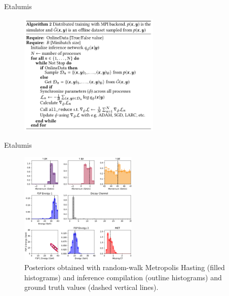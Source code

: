 \documentclass[AERbeamer%
              ,optEnglish%
              ,optBiber%
              ,optBibstyleAlphabetic%
              ,optBeamerClassicFormat%
              ]{AERlatex}%
\begin{document}
\begin{frame}[c]{Etalumis}
    \centering
    \begin{figure}
        \centering
        \includegraphics[width=0.6\textwidth]{EtalumisTrainingAlgorithm.png}
    \end{figure}
\end{frame}


\begin{frame}[c]{Etalumis}
    \centering
    \begin{figure}
        \centering
        \includegraphics[width=0.5\textwidth]{EtalumisParticlePosteriors.png}
        \caption{Posteriors obtained with random-walk Metropolis Hasting (filled histograms) and inference compilation (outline histograms) and
                 ground truth values (dashed vertical lines).}
    \end{figure}
\end{frame}
\end{document}
